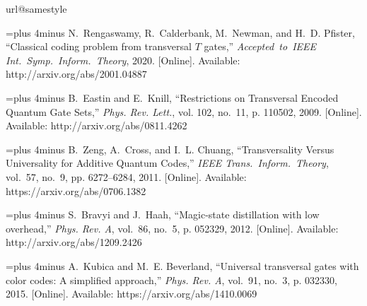 \documentclass[twoside,romanappendices]{IEEEtran}
\begin{document}
\begin{thebibliography}{10}
\providecommand{\url}[1]{#1}
\csname url@samestyle\endcsname
\providecommand{\newblock}{\relax}
\providecommand{\bibinfo}[2]{#2}
\providecommand{\BIBentrySTDinterwordspacing}{\spaceskip=0pt\relax}
\providecommand{\BIBentryALTinterwordstretchfactor}{4}
\providecommand{\BIBentryALTinterwordspacing}{\spaceskip=\fontdimen2\font plus
\BIBentryALTinterwordstretchfactor\fontdimen3\font minus
  \fontdimen4\font\relax}
\providecommand{\BIBforeignlanguage}[2]{{%
\expandafter\ifx\csname l@#1\endcsname\relax
\typeout{** WARNING: IEEEtran.bst: No hyphenation pattern has been}%
\typeout{** loaded for the language `#1'. Using the pattern for}%
\typeout{** the default language instead.}%
\else
\language=\csname l@#1\endcsname
\fi
#2}}
\providecommand{\BIBdecl}{\relax}
\BIBdecl

\BIBentryALTinterwordspacing
N.~Rengaswamy, R.~Calderbank, M.~Newman, and H.~D. Pfister, ``Classical coding
  problem from transversal {$T$} gates,'' \emph{Accepted\ to\ IEEE Int.\ Symp.\
  Inform.\ Theory}, 2020. [Online]. Available:
  \url{http://arxiv.org/abs/2001.04887}
\BIBentrySTDinterwordspacing

\BIBentryALTinterwordspacing
B.~Eastin and E.~Knill, ``{Restrictions on Transversal Encoded Quantum Gate
  Sets},'' \emph{Phys. Rev. Lett.}, vol. 102, no.~11, p. 110502, 2009.
  [Online]. Available: \url{http://arxiv.org/abs/0811.4262}
\BIBentrySTDinterwordspacing

\BIBentryALTinterwordspacing
B.~Zeng, A.~Cross, and I.~L. Chuang, ``{Transversality Versus Universality for
  Additive Quantum Codes},'' \emph{IEEE Trans.\ Inform.\ Theory}, vol.~57,
  no.~9, pp. 6272--6284, 2011. [Online]. Available:
  \url{https://arxiv.org/abs/0706.1382}
\BIBentrySTDinterwordspacing

\BIBentryALTinterwordspacing
S.~Bravyi and J.~Haah, ``{Magic-state distillation with low overhead},''
  \emph{Phys. Rev. A}, vol.~86, no.~5, p. 052329, 2012. [Online]. Available:
  \url{http://arxiv.org/abs/1209.2426}
\BIBentrySTDinterwordspacing

\BIBentryALTinterwordspacing
A.~Kubica and M.~E. Beverland, ``{Universal transversal gates with color codes:
  A simplified approach},'' \emph{Phys. Rev. A}, vol.~91, no.~3, p. 032330,
  2015. [Online]. Available: \url{https://arxiv.org/abs/1410.0069}
\BIBentrySTDinterwordspacing


\end{thebibliography}
\end{document}
